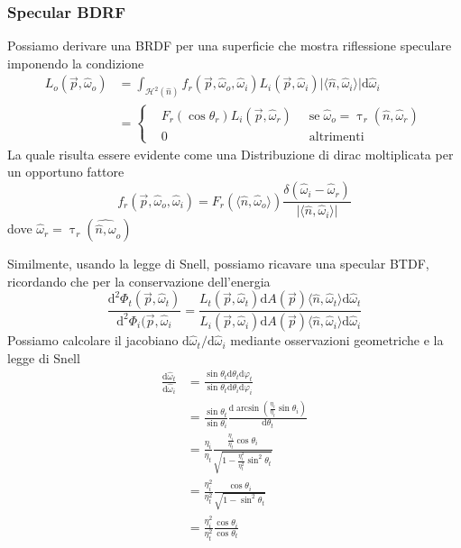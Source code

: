 \subsubsection{Specular BDRF}
Possiamo derivare una BRDF per una superficie che mostra riflessione speculare imponendo la condizione\footnotemark{}
\begin{align}
	L_o(\vec{p},\hat{\omega}_o)&=\int_{\mathcal{H}^2(\hat{n})}f_r(\vec{p},\hat{\omega}_o,\hat{\omega}_i)%
		L_i(\vec{p},\hat{\omega}_i)\vert\langle\hat{n},\hat{\omega}_i\rangle\vert\mathrm{d}\hat{\omega}_i%
		\\&=\left\{\begin{aligned}
			&F_r(\cos\theta_r)L_i(\vec{p},\hat{\omega}_r)\;\;&\mathrm{se}\;\hat{\omega}_o=\uptau_r(\hat{n},\hat{\omega}_r)\\
			&0 &\mathrm{altrimenti}
		\end{aligned}\right.
\end{align}
La quale risulta essere evidente come una Distribuzione di dirac moltiplicata per un opportuno fattore\footnotemark{}
\begin{equation}
	f_r(\vec{p},\hat{\omega}_o,\hat{\omega}_i)=F_r(\langle\hat{n},\hat{\omega}_o\rangle)%
		\frac{\delta(\hat{\omega}_i-\hat{\omega}_r)}{\vert\langle\hat{n},\hat{\omega}_i\rangle\vert}
\end{equation}
dove $\hat{\omega}_r=\uptau_r(\hat{\hat{n},\omega}_o)$\par
Similmente, usando la legge di Snell, possiamo ricavare una specular BTDF, ricordando che per la conservazione dell'energia
\begin{equation}
	\frac{\mathrm{d}^2\Phi_t(\vec{p},\hat{\omega}_t)}{\mathrm{d}^2\Phi_i(\vec{p},\hat{\omega}_i} = %
		\frac{L_t(\vec{p},\hat{\omega}_t)\mathrm{d}A(\vec{p})\langle\hat{n},\hat{\omega}_t\rangle\mathrm{d}\hat{\omega}_t}%
		{L_i(\vec{p},\hat{\omega}_i)\mathrm{d}A(\vec{p})\langle\hat{n},\hat{\omega}_i\rangle\mathrm{d}\hat{\omega}_i}
\end{equation}
Possiamo calcolare il jacobiano $\mathrm{d}\hat{\omega}_t/\mathrm{d}\hat{\omega}_i$ mediante osservazioni geometriche e la legge di Snell
\begin{align}
	\frac{\mathrm{d}\hat{\omega}_t}{\mathrm{d}\hat{\omega}_i} &= %
		\frac{\sin\theta_t\mathrm{d}\theta_t\mathrm{d}\varphi_t}{\sin\theta_t\mathrm{d}\theta_i\mathrm{d}\varphi_i} \nonumber \\
	&= \frac{\sin\theta_t}{\sin\theta_i}\frac{\mathrm{d}\arcsin\left(\frac{\eta_i}{\eta_t}\sin\theta_i\right)}{\mathrm{d}\theta_t} \nonumber \\
	&= \frac{\eta_i}{\eta_t}\frac{\frac{\eta_i}{\eta_t}\cos\theta_i}{\sqrt{1-\frac{\eta_i^2}{\eta_t^2}\sin^2\theta_t}} \nonumber \\
	&= \frac{\eta_i^2}{\eta_t^2}\frac{\cos\theta_i}{\sqrt{1-\sin^2\theta_t}} \nonumber \\
	&= \frac{\eta_i^2}{\eta_t^2}\frac{\cos\theta_i}{\cos\theta_t}
\end{align}
